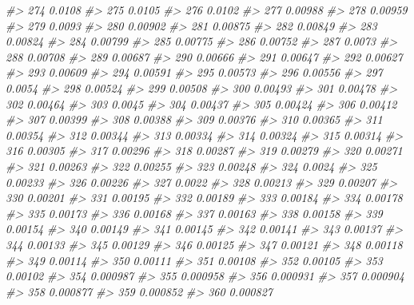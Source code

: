 \documentclass[]{book}
\newenvironment{Shaded}{\begin{snugshade}}{\end{snugshade}}
\newcommand{\CommentTok}[1]{\textcolor[rgb]{0.56,0.35,0.01}{\textit{#1}}}
\begin{document}
\begin{Shaded}
\begin{Highlighting}[]
\CommentTok{#> 274  0.0108 }
\CommentTok{#> 275  0.0105 }
\CommentTok{#> 276  0.0102 }
\CommentTok{#> 277  0.00988 }
\CommentTok{#> 278  0.00959 }
\CommentTok{#> 279  0.0093 }
\CommentTok{#> 280  0.00902 }
\CommentTok{#> 281  0.00875 }
\CommentTok{#> 282  0.00849 }
\CommentTok{#> 283  0.00824 }
\CommentTok{#> 284  0.00799 }
\CommentTok{#> 285  0.00775 }
\CommentTok{#> 286  0.00752 }
\CommentTok{#> 287  0.0073 }
\CommentTok{#> 288  0.00708 }
\CommentTok{#> 289  0.00687 }
\CommentTok{#> 290  0.00666 }
\CommentTok{#> 291  0.00647 }
\CommentTok{#> 292  0.00627 }
\CommentTok{#> 293  0.00609 }
\CommentTok{#> 294  0.00591 }
\CommentTok{#> 295  0.00573 }
\CommentTok{#> 296  0.00556 }
\CommentTok{#> 297  0.0054 }
\CommentTok{#> 298  0.00524 }
\CommentTok{#> 299  0.00508 }
\CommentTok{#> 300  0.00493 }
\CommentTok{#> 301  0.00478 }
\CommentTok{#> 302  0.00464 }
\CommentTok{#> 303  0.0045 }
\CommentTok{#> 304  0.00437 }
\CommentTok{#> 305  0.00424 }
\CommentTok{#> 306  0.00412 }
\CommentTok{#> 307  0.00399 }
\CommentTok{#> 308  0.00388 }
\CommentTok{#> 309  0.00376 }
\CommentTok{#> 310  0.00365 }
\CommentTok{#> 311  0.00354 }
\CommentTok{#> 312  0.00344 }
\CommentTok{#> 313  0.00334 }
\CommentTok{#> 314  0.00324 }
\CommentTok{#> 315  0.00314 }
\CommentTok{#> 316  0.00305 }
\CommentTok{#> 317  0.00296 }
\CommentTok{#> 318  0.00287 }
\CommentTok{#> 319  0.00279 }
\CommentTok{#> 320  0.00271 }
\CommentTok{#> 321  0.00263 }
\CommentTok{#> 322  0.00255 }
\CommentTok{#> 323  0.00248 }
\CommentTok{#> 324  0.0024 }
\CommentTok{#> 325  0.00233 }
\CommentTok{#> 326  0.00226 }
\CommentTok{#> 327  0.0022 }
\CommentTok{#> 328  0.00213 }
\CommentTok{#> 329  0.00207 }
\CommentTok{#> 330  0.00201 }
\CommentTok{#> 331  0.00195 }
\CommentTok{#> 332  0.00189 }
\CommentTok{#> 333  0.00184 }
\CommentTok{#> 334  0.00178 }
\CommentTok{#> 335  0.00173 }
\CommentTok{#> 336  0.00168 }
\CommentTok{#> 337  0.00163 }
\CommentTok{#> 338  0.00158 }
\CommentTok{#> 339  0.00154 }
\CommentTok{#> 340  0.00149 }
\CommentTok{#> 341  0.00145 }
\CommentTok{#> 342  0.00141 }
\CommentTok{#> 343  0.00137 }
\CommentTok{#> 344  0.00133 }
\CommentTok{#> 345  0.00129 }
\CommentTok{#> 346  0.00125 }
\CommentTok{#> 347  0.00121 }
\CommentTok{#> 348  0.00118 }
\CommentTok{#> 349  0.00114 }
\CommentTok{#> 350  0.00111 }
\CommentTok{#> 351  0.00108 }
\CommentTok{#> 352  0.00105 }
\CommentTok{#> 353  0.00102 }
\CommentTok{#> 354  0.000987 }
\CommentTok{#> 355  0.000958 }
\CommentTok{#> 356  0.000931 }
\CommentTok{#> 357  0.000904 }
\CommentTok{#> 358  0.000877 }
\CommentTok{#> 359  0.000852 }
\CommentTok{#> 360  0.000827 }

\end{Highlighting}
\end{Shaded}
\end{document}
